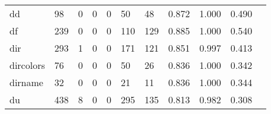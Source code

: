 \begin{longtable}{lp{1.2cm}p{1.2cm}p{1.2cm}p{1.2cm}p{1.2cm}p{1.2cm}p{1.2cm}p{1.2cm}p{1.2cm}p{1.2cm}}
dd        &                                    98 &                                                  0 &                                                  0 &                                                  0 &                                                 50 &                                                 48 &                                         0.872 &                                              1.000 &                                              0.490 \\
df        &                                   239 &                                                  0 &                                                  0 &                                                  0 &                                                110 &                                                129 &                                         0.885 &                                              1.000 &                                              0.540 \\
dir       &                                   293 &                                                  1 &                                                  0 &                                                  0 &                                                171 &                                                121 &                                         0.851 &                                              0.997 &                                              0.413 \\
dircolors &                                    76 &                                                  0 &                                                  0 &                                                  0 &                                                 50 &                                                 26 &                                         0.836 &                                              1.000 &                                              0.342 \\
dirname   &                                    32 &                                                  0 &                                                  0 &                                                  0 &                                                 21 &                                                 11 &                                         0.836 &                                              1.000 &                                              0.344 \\
du        &                                   438 &                                                  8 &                                                  0 &                                                  0 &                                                295 &                                                135 &                                         0.813 &                                              0.982 &                                              0.308 \\

\end{longtable}
